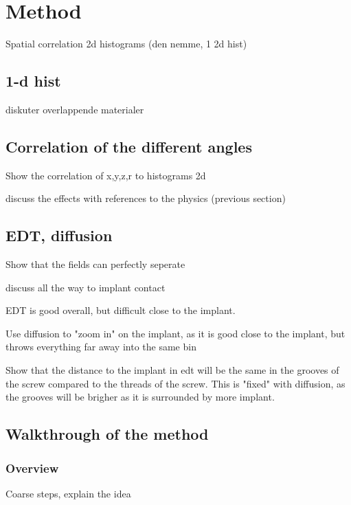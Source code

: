 \section{Method}
Spatial correlation 2d histograms (den nemme, 1 2d hist)

\subsection{1-d hist}
diskuter overlappende materialer

\subsection{Correlation of the different angles}
Show the correlation of x,y,z,r to histograms 2d

discuss the effects with references to the physics (previous section)

\subsection{EDT, diffusion}
Show that the fields can perfectly seperate

discuss all the way to implant contact

EDT is good overall, but difficult close to the implant. 

Use diffusion to "zoom in" on the implant, as it is good close to the implant, but throws everything far away into the same bin

Show that the distance to the implant in edt will be the same in the grooves of the screw compared to the threads of the screw. This is "fixed" with diffusion, as the grooves will be brigher as it is surrounded by more implant.

\subsection{Walkthrough of the method}

\subsubsection{Overview}
Coarse steps, explain the idea


